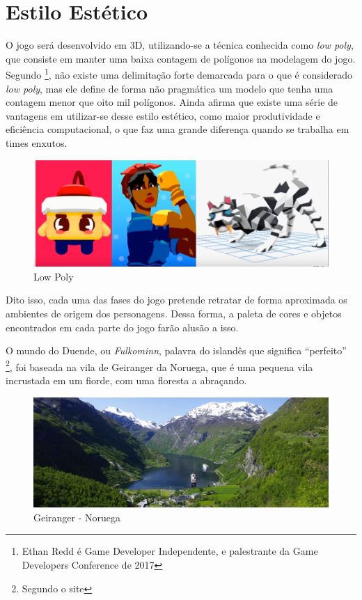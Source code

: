 \section{Estilo Estético}
O jogo será desenvolvido em 3D, utilizando-se a técnica conhecida como \textit{low poly}, que consiste em manter uma baixa contagem de polígonos na modelagem do jogo. Segundo  \footnote{Ethan Redd é Game Developer Independente, e palestrante da Game Developers Conference de 2017}, não existe uma delimitação forte demarcada para o que é considerado \textit{low poly}, mas ele define de forma não pragmática um modelo que tenha uma contagem menor que oito mil polígonos. Ainda afirma que existe uma série de vantagens em utilizar-se desse estilo estético, como maior produtividade e eficiência computacional, o que faz uma grande diferença quando se trabalha em times enxutos.

\begin{figure}[htb]
    \caption{\label{fig_lowpoly}Low Poly}
    \begin{center}
        \includegraphics[width=\textwidth]{imagens/lowPoly.jpg}
    \end{center}
\end{figure}

Dito isso, cada uma das fases do jogo pretende retratar de forma aproximada os ambientes de origem dos personagens. Dessa forma, a paleta de cores e objetos encontrados em cada parte do jogo farão alusão a isso.

O mundo do Duende, ou \textit{Fulkominn}, palavra do islandês que significa ``perfeito'' \footnote{Segundo o site }, foi baseada na vila de Geiranger da Noruega, que é uma pequena vila incrustada em um fiorde, com uma floresta a abraçando.


\begin{figure}[htb]
    \caption{\label{fig_mundoDuende}Geiranger - Noruega}
    \begin{center}
        \includegraphics[width=\textwidth]{imagens/geiranger.jpeg}
    \end{center}
\end{figure}

